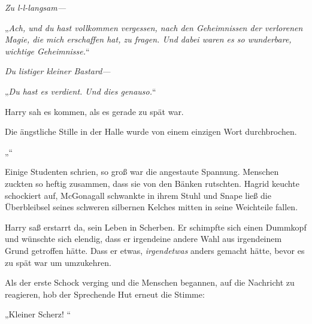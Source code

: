 \emph{Zu l-l-langsam—}

„\emph{Ach, und du hast vollkommen vergessen, nach den Geheimnissen der verlorenen Magie, die mich erschaffen hat, zu fragen. Und dabei waren es so wunderbare, wichtige Geheimnisse.}“

\emph{Du listiger kleiner \emph{Bastard}—}

„\emph{Du hast es verdient. Und dies genauso.}“

Harry sah es kommen, als es gerade zu spät war.

Die ängstliche Stille in der Halle wurde von einem einzigen Wort durchbrochen.

„“

Einige Studenten schrien, so groß war die angestaute Spannung. Menschen zuckten so heftig zusammen, dass sie von den Bänken rutschten. Hagrid keuchte schockiert auf, McGonagall schwankte in ihrem Stuhl und Snape ließ die Überbleibsel seines schweren silbernen Kelches mitten in seine Weichteile fallen.

Harry saß erstarrt da, sein Leben in Scherben. Er schimpfte sich einen Dummkopf und wünschte sich elendig, dass er irgendeine andere Wahl aus irgendeinem Grund getroffen hätte. Dass er etwas, \emph{irgendetwas} anders gemacht hätte, bevor es zu spät war um umzukehren.

Als der erste Schock verging und die Menschen begannen, auf die Nachricht zu reagieren, hob der Sprechende Hut erneut die Stimme:

„Kleiner Scherz! “

